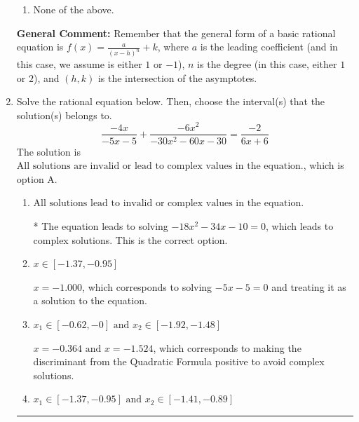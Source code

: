 \documentclass{extbook}[14pt]
\newcommand{\litem}[1]{\item #1

\rule{\textwidth}{0.4pt}}
\begin{document}
\begin{enumerate}
{\begin{enumerate}[label=\Alph*.]
\item None of the above.\end{enumerate}
\textbf{General Comment:} Remember that the general form of a basic rational equation is $ f(x) = \frac{a}{(x-h)^n} + k$, where $a$ is the leading coefficient (and in this case, we assume is either $1$ or $-1$), $n$ is the degree (in this case, either $1$ or $2$), and $(h, k)$ is the intersection of the asymptotes.
}
\litem{
Solve the rational equation below. Then, choose the interval(s) that the solution(s) belongs to.
\[ \frac{-4x}{-5x -5} + \frac{-6x^{2}}{-30x^{2} -60 x -30} = \frac{-2}{6x + 6} \]The solution is \( \text{All solutions are invalid or lead to complex values in the equation.} \), which is option A.\begin{enumerate}[label=\Alph*.]
\item \( \text{All solutions lead to invalid or complex values in the equation.} \)

* The equation leads to solving $-18x^{2} -34 x -10=0$, which leads to complex solutions. This is the correct option.
\item \( x \in [-1.37,-0.95] \)

$x = -1.000$, which corresponds to solving $-5x -5 = 0$ and treating it as a solution to the equation.
\item \( x_1 \in [-0.62, -0] \text{ and } x_2 \in [-1.92,-1.48] \)

$x = -0.364 \text{ and } x = -1.524$, which corresponds to making the discriminant from the Quadratic Formula positive to avoid complex solutions.
\item \( x_1 \in [-1.37, -0.95] \text{ and } x_2 \in [-1.41,-0.89] \)


\end{enumerate}}
\end{enumerate}
\end{document}
